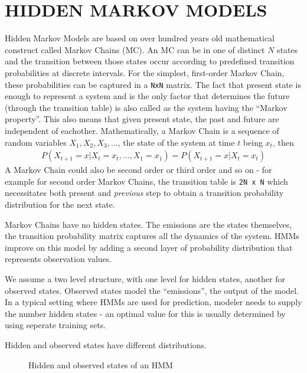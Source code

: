 
\chapter{HIDDEN MARKOV MODELS}

Hidden Markov Models are based on over hundred years old mathematical construct
called Markov Chains (MC). An MC can be in one of distinct $N$ states and the
transition between those states occur according to predefined transition
probabilities at discrete intervals. For the simplest, first-order Markov Chain,
these probabilities can be captured in a \verb!NxN!  matrix. The fact that
present state is enough to represent a system and is the only factor that
determines the future (through the transition table) is also called as the
system having the ``Markov property''. This also means that given present state,
the past and future are independent of eachother. Mathematically, a Markov Chain
is a sequence of random variables $X_1,X_2,X_3,...$, the state of the system at
time $t$ being $x_t$, then
\begin{eqnarray*}
P(X_{t+1} = x | X_t = x_t,...,X_1=x_1) = P(X_{t+1} = x | X_t = x_t)
\end{eqnarray*}
A Markov Chain could also be second order or third order and so on - for example
for second order Markov Chains, the transition table is \verb!2N x N! which
necessitates both present and {\em previous} step to obtain a transition probability
distribution for the next state.

Markov Chains have no hidden states. The emissions are the states themselves,
the transition probability matrix captures all the dynamics of the system. HMMs
improve on this model by adding a second layer of probability distribution that
represents observation values.

We assume a two level structure, with one level for hidden states, another for
observed states. Observed states model the ``emissions'', the output of the
model. In a typical setting where HMMs are used for prediction, modeler needs to
supply the number hidden states - an optimal value for this is usually
determined by using seperate training sets. 

Hidden and observed states have different distributions.

\begin{figure}[!hbp]
\caption{Hidden and observed states of an HMM}
\vspace{0.6cm}
\end{figure}


